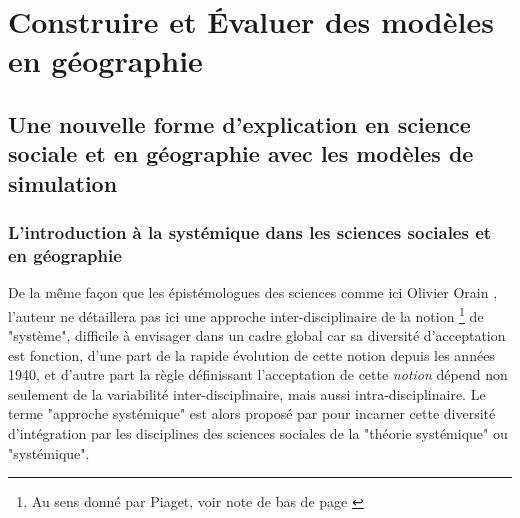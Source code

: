 
\graphicspath{{Figure1/}}

\chapter{Construire et Évaluer des modèles en géographie}

\startcontents[chapters]
\Mprintcontents

\section{Une nouvelle forme d’explication en science sociale et en géographie avec les modèles de simulation}


\subsection {L'introduction à la systémique dans les sciences sociales et en géographie}

De la même façon que les épistémologues des sciences comme ici Olivier Orain \autocite{Orain2001}, l'auteur ne détaillera pas ici une approche inter-disciplinaire de la notion \footnote{Au sens donné par Piaget, voir note de bas de page \autocite {Orain2001}} de "système", difficile à envisager dans un cadre global car sa diversité d'acceptation est fonction, d'une part de la rapide évolution de cette notion depuis les années 1940, et d'autre part la règle définissant l'acceptation de cette \textit{notion} dépend non seulement de la variabilité inter-disciplinaire, mais aussi intra-disciplinaire. Le terme "approche systémique" est alors proposé par \autocite{Orain2001} pour incarner cette diversité d'intégration par les disciplines des sciences sociales de la "théorie systémique" ou "systémique". 

